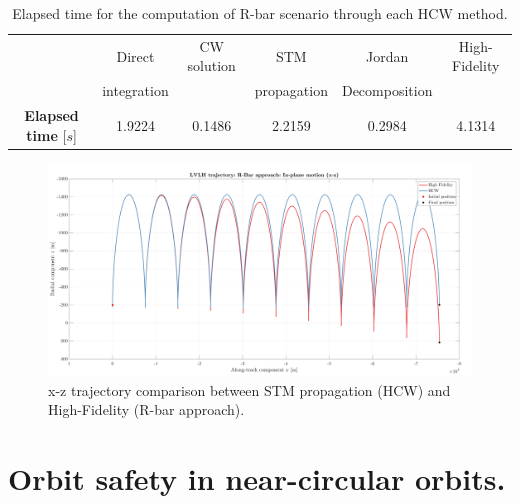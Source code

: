 		\begin{table}[!htb]
		\centering
		\begin{tabular}{|c|c|c|c|c|c|}
		\hline 
		\rowcolor{Gray!10}
		 													& Direct 		& CW solution 		& STM 			& Jordan  			& High-Fidelity \\ 
		\rowcolor{Gray!10} 
		\multirow{-2}{*}{\textbf{Method}}					& integration 	&   				& propagation 	&  Decomposition 	&  \\ 
		\hline 
		\cellcolor{Gray!10} {\textbf{Elapsed time} [$s$]}  	& 1.9224 & 0.1486 & 2.2159 & 0.2984 & 4.1314 \\ 
		\hline 
		\end{tabular} 
		\caption{Elapsed time for the computation of R-bar scenario through each HCW method.}
		\label{tabCh2:HCW_Rbar}
		\end{table}
		\begin{figure}[!htb]
		\begin{changemargin}{-1.3cm}{-1cm}
		\begin{adjustbox}{width=1.1\textwidth}
		\centering\includegraphics[width = \linewidth]{Chapters/Chapter_02/High_quality/LVLH_trajectory__R_Bar_approach_IP}
		\end{adjustbox}
		\end{changemargin}
		\caption{x-z trajectory comparison between STM propagation (HCW) and High-Fidelity (R-bar approach).}
		\label{figCh2:LVLH_R_bar}
		\end{figure}

\section{Orbit safety in near-circular orbits.}
%
%
